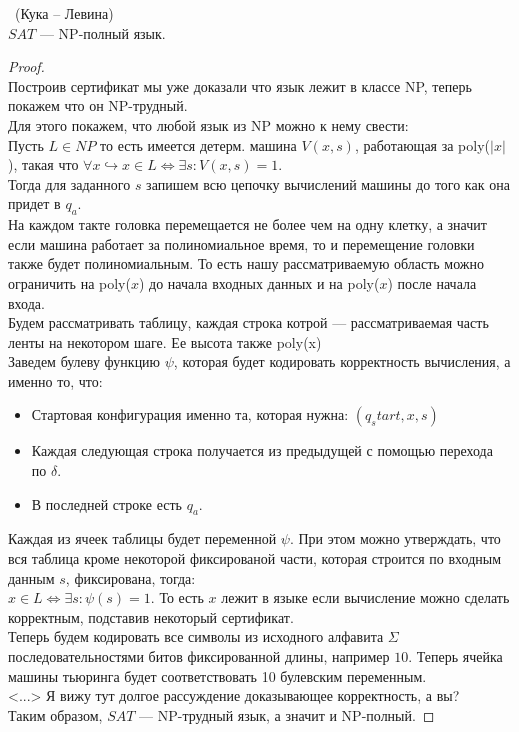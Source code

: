 \begin{theorem} \ (Кука -- Левина) \\
   $SAT$ ---  NP-полный язык. 
\end{theorem}
\begin{proof} \ \\
    Построив сертификат мы уже доказали что язык лежит в классе NP, теперь покажем что он NP-трудный. \\
    Для этого покажем, что любой язык из NP можно к нему свести: \\
    Пусть $L \in NP$ то есть имеется детерм. машина $V(x, s)$, работающая за poly($\lvert x \rvert$), такая что 
    $\forall x \hookrightarrow x \in L \iff \exists s: V(x, s) = 1$. \\

    Тогда для заданного $s$ запишем всю цепочку вычислений машины до того как она придет в  $q_a$. \\
    На каждом такте головка перемещается не более чем на одну клетку, а значит если машина работает за полиномиальное время,
    то и перемещение головки также будет полиномиальным. То есть нашу рассматриваемую область 
    можно ограничить на poly($x$) до начала входных данных и на poly($x$) после начала входа. \\
    Будем рассматривать таблицу, каждая строка котрой --- рассматриваемая часть ленты на некотором шаге. Ее высота также poly(x) \\
    Заведем булеву функцию $\psi$, которая будет кодировать корректность вычисления, а именно то, что:
    \begin{itemize}
        \item Стартовая конфигурация именно та, которая нужна: $(q_start, x, s)$
        \item Каждая следующая строка получается из предыдущей с помощью перехода по  $\delta$.
        \item В последней строке есть  $q_a$.
    \end{itemize}
    Каждая из ячеек таблицы будет переменной $\psi$. При этом можно утверждать, что вся таблица кроме некоторой фиксированой части, 
    которая строится по входным данным $s$, фиксирована, тогда: \\
    $x \in L \iff \exists s: \psi(s) = 1$. То есть $x$ лежит в языке если вычисление можно сделать корректным, подставив некоторый сертификат. \\
    Теперь будем кодировать все символы из исходного алфавита $\Sigma$ последовательностями битов фиксированной длины, например $10$. 
    Теперь ячейка машины тьюринга будет соответствовать 10 булевским переменным.  \\
    <...> Я вижу тут долгое рассуждение доказывающее корректность, а вы? \\
    Таким образом,  $SAT$ --- NP-трудный язык, а значит и NP-полный.

    


\end{proof}
